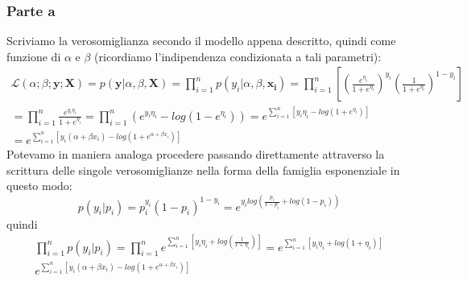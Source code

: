 \subsubsection*{Parte a} 
Scriviamo la verosomiglianza secondo il modello appena descritto, quindi come funzione di $\alpha$ e $\beta$ (ricordiamo l'indipendenza condizionata a tali parametri):
\begin{gather}
\nonumber\mathcal{L}(\alpha;\beta;\mathbf{y};\mathbf{X}) = p(\mathbf{y}|\alpha, \beta, \mathbf{X}) = \prod_{i=1}^{n}p(y_i |\alpha, \beta, \mathbf{x_i}) = \prod_{i=1}^{n}\left[\left(\frac{e^{\eta_i}}{1+e^{\eta_i}}\right)^{y_i}\left(\frac{1}{1+e^{\eta_i}}\right)^{1-y_i}\right] \\
\nonumber=\prod_{i=1}^{n} \frac{e^{y_i\eta_i}}{1+e^{\eta_i}} = \prod_{i=1}^{n}(e^{y_i\eta_i} - log(1-e^{\eta_i})) = e^{\sum_{i=1}^{n}[y_i\eta_i - log(1+e^{\eta_i})]} \\
\nonumber=e^{\sum_{i=1}^{n}[y_i(\alpha+\beta x_i) - log(1+e^{\alpha+\beta x_i})]}
\end{gather}
Potevamo in maniera analoga procedere passando direttamente attraverso la scrittura delle singole verosomiglianze nella forma della famiglia esponenziale in questo modo:
$$p(y_i|p_i) = p_i^{y_i}(1-p_i)^{1-y_i} = e^{y_i log(\frac{p_i}{1-p_i}+log(1-p_i))}$$
quindi
\begin{gather}
\nonumber \prod_{i=1}^{n} p(y_i|p_i) = \prod_{i=1}^{n} e^{\sum_{i=1}^{n}[y_i \eta_i + log(\frac{1}{1+\eta_i})]} = e^{\sum_{i=1}^{n}[y_i \eta_i + log(1+\eta_i)]}\\
\nonumber e^{\sum_{i=1}^{n}[y_i(\alpha+\beta x_i) - log(1+e^{\alpha+\beta x_i})]}
\end{gather}
